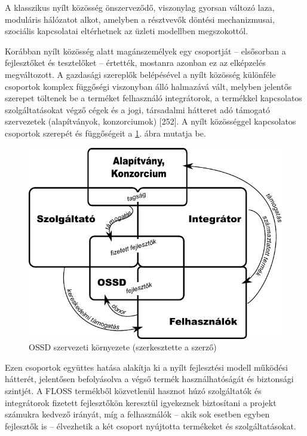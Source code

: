 \documentclass[12pt,magyar,a4paper,oneside]{scrreprt}
\begin{document}
A klasszikus nyílt közösség önszerveződő, viszonylag gyorsan változó
laza, moduláris hálózatot alkot, amelyben a résztvevők döntési
mechanizmusai, szociális kapcsolatai eltérhetnek az üzleti modellben
megszokottól.

Korábban nyílt közösség alatt magánszemélyek egy csoportját --
elsősorban a fejlesztőket és tesztelőket -- értették, mostanra azonban
ez az elképzelés megváltozott. A gazdasági szereplők belépésével a nyílt
közösség különféle csoportok komplex függőségi viszonyban álló halmazává
vált, melyben jelentős szerepet töltenek be a terméket felhasználó
integrátorok, a termékkel kapcsolatos szolgáltatásokat végző cégek és a
jogi, társadalmi hátteret adó támogató szervezetek (alapítványok,
konzorciumok) {[}252{]}. A nyílt közösséggel kapcsolatos csoportok
szerepét és függőségeit a \ref{fig:OSSDSzerv}. ábra mutatja be.

\begin{figure}
\hypertarget{fig:OSSDSzerv}{%
\centering
\includegraphics{ábrák/OSSD-szervezeti-környezete.pdf}
\caption{OSSD szervezeti környezete (szerkesztette a
szerző)}\label{fig:OSSDSzerv}
}
\end{figure}

Ezen csoportok együttes hatása alakítja ki a nyílt fejlesztési modell
működési hátterét, jelentősen befolyásolva a végső termék
használhatóságát és biztonsági szintjét. A FLOSS termékből közvetlenül
hasznot húzó szolgáltatók és integrátorok fizetett fejlesztőkön
keresztül igyekeznek biztosítani a projekt számukra kedvező irányát, míg
a felhasználók -- akik sok esetben egyben fejlesztők is -- élvezhetik a
két csoport nyújtotta termékeket és szolgáltatásokat.
\end{document}
